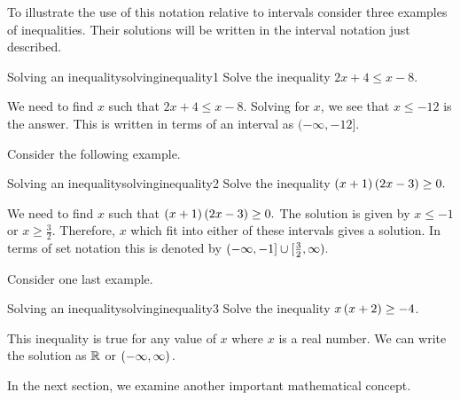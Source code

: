 To illustrate the use of this notation relative to intervals consider three
examples of inequalities. Their solutions will be written in the interval notation
just described.

\begin{example}{Solving an inequality}{solvinginequality1}
Solve the inequality $2x+4\leq x-8$.
\end{example}

\begin{solution}
We need to find $x$ such that $2x+4\leq x-8$. Solving for $x$, we see that 
$x\leq -12$ is the answer. This is written in terms of an interval as $(-\infty ,-12].$
\end{solution}

Consider the following example.

\begin{example}{Solving an inequality}{solvinginequality2}
Solve the inequality $\left(x+1\right) \left(2x-3\right) \geq0.$
\end{example}

\begin{solution}
We need to find $x$ such that $\left(x+1\right) \left(2x-3\right) \geq0.$ 
The solution is given by  $x\leq -1$ or $x\geq \frac{3}{2}$. Therefore, 
$x$ which fit into either of these intervals gives a solution. In terms of set notation this is denoted by $(-\infty ,-1]\cup
[ \vspace{0.05in}\frac{3}{2},\infty ).$
\end{solution}

Consider one last example.

\begin{example}{Solving an inequality}{solvinginequality3}
Solve the inequality $x \left(x+2\right) \geq-4$.
\end{example}

\begin{solution}
This inequality is true for any value of $x$ where $x$ is a real number. We can write the solution as $\mathbb{R}$ or $\left(
-\infty ,\infty \right) .$
\end{solution}

In the next section, we examine another important mathematical concept.
